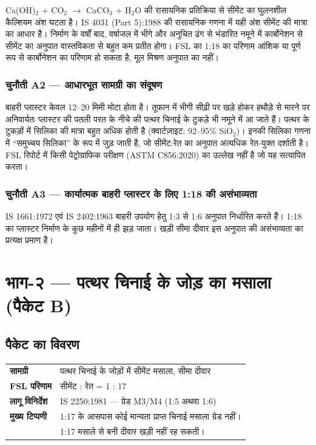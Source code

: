 \documentclass[12pt, a4paper]{article}
\begin{document}
Ca(OH)$_2$ + CO$_2$ $\rightarrow$ CaCO$_3$ + H$_2$O की रासायनिक प्रतिक्रिया से सीमेंट का घुलनशील कैल्शियम अंश घटता है। IS 4031 (Part 5):1988 की रासायनिक गणना में यही अंश सीमेंट की मात्रा का आधार है। निर्माण के वर्षों बाद, वर्षाजल में भीगे और अनुचित ढंग से भंडारित नमूने में कार्बोनेशन से सीमेंट का अनुपात वास्तविकता से बहुत कम प्रतीत होगा। FSL का 1:18 का परिणाम आंशिक या पूर्ण रूप से कार्बोनेशन का परिणाम हो सकता है, मूल मिश्रण अनुपात का नहीं।

\subsubsection{चुनौती A2 --- आधारभूत सामग्री का संदूषण}

बाहरी प्लास्टर केवल 12--20 मिमी मोटा होता है। तूफान में भीगी सीढ़ी पर खड़े होकर हथौड़े से मारने पर अनिवार्यतः प्लास्टर की पतली परत के नीचे की पत्थर चिनाई के टुकड़े भी नमूने में आ जाते हैं। पत्थर के टुकड़ों में सिलिका की मात्रा बहुत अधिक होती है (क्वार्टज़ाइट: 92--95\% SiO$_2$)। इनकी सिलिका गणना में ``समुच्चय सिलिका'' के रूप में जुड़ जाती है, जो सीमेंट:रेत का अनुपात अत्यधिक रेत-युक्त दर्शाती है। FSL रिपोर्ट में किसी पेट्रोग्राफिक परीक्षण (ASTM C856:2020) का उल्लेख नहीं है जो यह सत्यापित करता।

\subsubsection{चुनौती A3 --- कार्यात्मक बाहरी प्लास्टर के लिए 1:18 की असंभाव्यता}

IS 1661:1972 एवं IS 2402:1963 बाहरी उपयोग हेतु 1:3 से 1:6 अनुपात निर्धारित करते हैं। 1:18 का प्लास्टर निर्माण के कुछ महीनों में ही झड़ जाता। खड़ी सीमा दीवार इस अनुपात की असंभाव्यता का प्रत्यक्ष प्रमाण है।

\section{भाग-२ --- पत्थर चिनाई के जोड़ का मसाला (पैकेट B)}

\subsection{पैकेट का विवरण}

\begin{center}
\begin{tabular}{|l|l|}
  \hline
  \textbf{सामग्री} & पत्थर चिनाई के जोड़ों में सीमेंट मसाला, सीमा दीवार \\
  \textbf{FSL परिणाम} & सीमेंट : रेत = 1 : 17 \\
  \textbf{लागू विनिर्देश} & IS 2250:1981 --- ग्रेड M3/M4 (1:5 अथवा 1:6) \\
  \textbf{मुख्य टिप्पणी} & 1:17 के आसपास कोई मान्यता प्राप्त चिनाई मसाला ग्रेड नहीं। \\
                         & 1:17 मसाले से बनी दीवार खड़ी नहीं रह सकती। \\
  \hline
\end{tabular}
\end{center}
\end{document}
